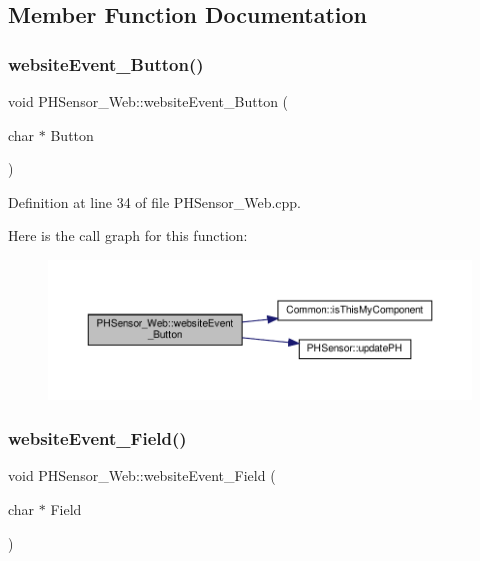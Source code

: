 \subsection{Member Function Documentation}
\mbox{\label{class_p_h_sensor___web_a54944c4adb45f117e3e209f903cc5bec}} 
\subsubsection{\texorpdfstring{website\+Event\+\_\+\+Button()}{websiteEvent\_Button()}}
{\footnotesize\ttfamily void P\+H\+Sensor\+\_\+\+Web\+::website\+Event\+\_\+\+Button (\begin{DoxyParamCaption}\item[{char $\ast$}]{Button }\end{DoxyParamCaption})}



Definition at line 34 of file P\+H\+Sensor\+\_\+\+Web.\+cpp.

Here is the call graph for this function\+:
\nopagebreak
\begin{figure}[H]
\begin{center}
\leavevmode
\includegraphics[width=350pt]{class_p_h_sensor___web_a54944c4adb45f117e3e209f903cc5bec_cgraph}
\end{center}
\end{figure}
\mbox{\label{class_p_h_sensor___web_a7e78a34b02adb20af3767c0db29a2dea}} 
\subsubsection{\texorpdfstring{website\+Event\+\_\+\+Field()}{websiteEvent\_Field()}}
{\footnotesize\ttfamily void P\+H\+Sensor\+\_\+\+Web\+::website\+Event\+\_\+\+Field (\begin{DoxyParamCaption}\item[{char $\ast$}]{Field }\end{DoxyParamCaption})}



